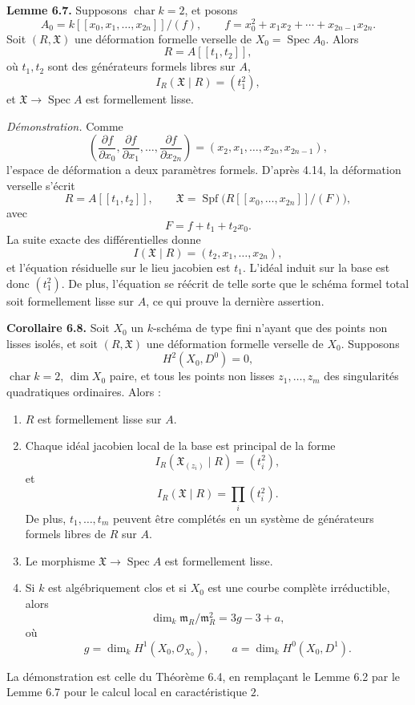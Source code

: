 \documentclass[11pt]{article}
\providecommand{\Spec}{\operatorname{Spec}}
\providecommand{\Spf}{\operatorname{Spf}}
\providecommand{\Oo}{\mathcal O}
\begin{document}
\textbf{Lemme 6.7.}  Supposons \(\operatorname{char}k=2\), et posons
\[
        A_0=
        k[[x_0,x_1,\ldots,x_{2n}]]/(f),
        \qquad
        f=x_0^2+x_1x_2+\cdots+x_{2n-1}x_{2n}.
\]
Soit \((R,\mathfrak X)\) une déformation formelle verselle de \(X_0=\Spec A_0\).  Alors
\[
        R=A[[t_1,t_2]],
\]
où \(t_1,t_2\) sont des générateurs formels libres sur \(A\),
\[
        I_R(\mathfrak X\mid R)=(t_1^2),
\]
et \(\mathfrak X\to\Spec A\) est formellement lisse.

\emph{Démonstration.}  Comme
\[
        \left(\frac{\partial f}{\partial x_0},
        \frac{\partial f}{\partial x_1},\ldots,
        \frac{\partial f}{\partial x_{2n}}\right)
        =
        (x_2,x_1,\ldots,x_{2n},x_{2n-1}),
\]
l'espace de déformation a deux paramètres formels.  D'après 4.14, la déformation verselle s'écrit
\[
        R=A[[t_1,t_2]],\qquad
        \mathfrak X=
        \Spf\bigl(R[[x_0,\ldots,x_{2n}]]/(F)\bigr),
\]
avec
\[
        F=f+t_1+t_2x_0.
\]
La suite exacte des différentielles donne
\[
        I(\mathfrak X\mid R)=(t_2,x_1,\ldots,x_{2n}),
\]
et l'équation résiduelle sur le lieu jacobien est \(t_1\).  L'idéal induit sur la base est donc \((t_1^2)\).  De plus, l'équation se réécrit de telle sorte que le schéma formel total soit formellement lisse sur \(A\), ce qui prouve la dernière assertion.

\textbf{Corollaire 6.8.}  Soit \(X_0\) un \(k\)-schéma de type fini n'ayant que des points non lisses isolés, et soit \((R,\mathfrak X)\) une déformation formelle verselle de \(X_0\).  Supposons
\[
        H^2(X_0,D^0)=0,
\]
\(\operatorname{char}k=2\), \(\dim X_0\) paire, et tous les points non lisses \(z_1,\ldots,z_m\) des singularités quadratiques ordinaires.  Alors :
\begin{enumerate}[label=(\arabic*)]
\item \(R\) est formellement lisse sur \(A\).
\item Chaque idéal jacobien local de la base est principal de la forme
\[
        I_R(\mathfrak X_{(z_i)}\mid R)=(t_i^2),
\]
et
\[
        I_R(\mathfrak X\mid R)=\prod_i (t_i^2).
\]
De plus, \(t_1,\ldots,t_m\) peuvent être complétés en un système de générateurs formels libres de \(R\) sur \(A\).
\item Le morphisme \(\mathfrak X\to\Spec A\) est formellement lisse.
\item Si \(k\) est algébriquement clos et si \(X_0\) est une courbe complète irréductible, alors
\[
        \dim_k\mathfrak m_R/\mathfrak m_R^2=3g-3+a,
\]
où
\[
        g=\dim_kH^1(X_0,\Oo_{X_0}),
        \qquad
        a=\dim_kH^0(X_0,D^1).
\]
\end{enumerate}

La démonstration est celle du Théorème 6.4, en remplaçant le Lemme 6.2 par le Lemme 6.7 pour le calcul local en caractéristique \(2\).
\end{document}

